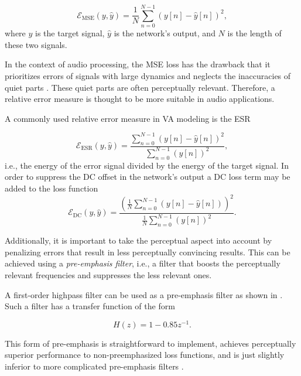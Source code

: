 \begin{equation}
  \mathcal{E}_\text{MSE}(y, \hat{y}) = \frac{1}{N} \sum \limits_{n=0}^{N-1} (y[n] - \hat{y}[n])^2,
\end{equation}
where $y$ is the target signal, $\hat{y}$ is the network's output, and $N$ is the length of these two signals.

In the context of audio processing, the \ac{MSE} loss has the drawback that it prioritizes errors of signals with large dynamics and neglects the inaccuracies of quiet parts \cite{Parker2019}. These quiet parts are often perceptually relevant. Therefore, a relative error measure is thought to be more suitable in audio applications.

A commonly used relative error measure in \ac{VA} modeling is the \ac{ESR} \cite{Wright2019,Wright2019a, Wrightetal2020,Wright2020}

\begin{equation}
  \mathcal{E}_\text{ESR}(y, \hat{y}) = \frac{\sum_{n=0}^{N-1} (y[n] - \hat{y}[n])^2}{\sum_{n=0}^{N-1} (y[n])^2},
  \label{eq:esr}
\end{equation}
i.e., the energy of the error signal divided by the energy of the target signal. In order to suppress the DC offset in the network's output a DC loss term may be added to the loss function \cite{Wright2019a,Wright2020}
\begin{equation}
  \mathcal{E}_\text{DC}(y, \hat{y}) = \frac{\left(\frac{1}{N} \sum_{n=0}^{N-1} (y[n] - \hat{y}[n])\right)^2}{\frac{1}{N} \sum_{n=0}^{N-1} (y[n])^2}.
\end{equation}

Additionally, it is important to take the perceptual aspect into account by penalizing errors that result in less perceptually convincing results. This can be achieved using a \emph{pre-emphasis filter}, i.e., a filter that boosts the perceptually relevant frequencies and suppresses the less relevant ones.

A first-order highpass filter can be used as a pre-emphasis filter as shown in \cite{Wright2019,Wrightetal2020,Wright2020}. Such a filter has a transfer function of the form

\begin{equation}
  H(z) = 1 - 0.85 z^{-1}.
  \label{eq:preemphasis_filter}
\end{equation}

This form of pre-emphasis is straightforward to implement, achieves perceptually superior performance to non-preemphasized loss functions, and is just slightly inferior to more complicated pre-emphasis filters \cite{Wright2019a}.

